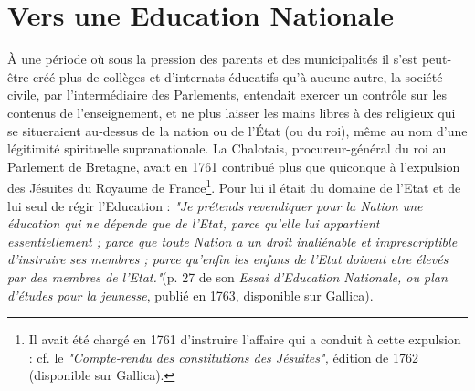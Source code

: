 \section{Vers une Education Nationale}
 À une période où sous la pression des parents et des municipalités il s'est peut-être créé plus de collèges et d'internats éducatifs qu'à aucune autre, la société civile, par l'intermédiaire des Parlements, entendait exercer un contrôle sur les contenus de l'enseignement, et ne plus laisser les mains libres à des religieux qui se situeraient au-dessus de la nation ou de l'État (ou du roi), même au nom d'une légitimité spirituelle supranationale. 
 La Chalotais, procureur-général du roi au Parlement de Bretagne, avait en 1761 contribué plus que quiconque à l'expulsion des Jésuites du Royaume de France\footnote{Il avait été chargé en 1761 d'instruire l'affaire qui a conduit à cette expulsion : cf. le \emph{"Compte-rendu des constitutions des Jésuites",} édition de 1762 (disponible sur Gallica).}. 
Pour lui il était du domaine de l'Etat et de lui seul de régir l'Education :  \emph{"Je prétends revendiquer pour la Nation une éducation qui ne dépende que de l'Etat, parce qu'elle lui appartient essentiellement ; parce que toute Nation a un droit inaliénable et imprescriptible d'instruire ses membres ; parce qu'enfin les enfans de l'Etat doivent etre élevés par des membres de l'Etat."}(p. 27 de son \emph{Essai d'Education Nationale, ou plan d'études pour la jeunesse}, publié en 1763, disponible sur Gallica).

